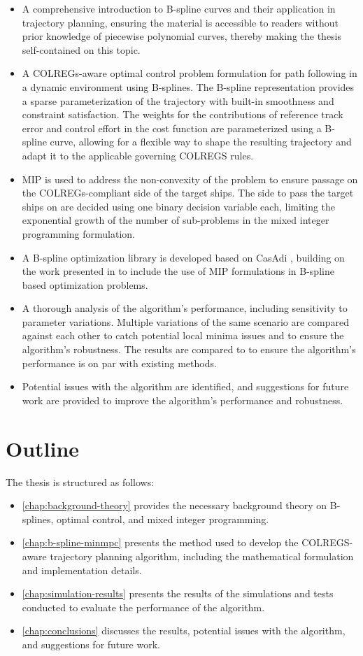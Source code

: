 \begin{itemize}
    \item A comprehensive introduction to B-spline curves and their application in trajectory planning, ensuring the material is accessible to readers without prior knowledge of piecewise polynomial curves, thereby making the thesis self-contained on this topic.
    \item A COLREGs-aware optimal control problem formulation for path following in a dynamic environment using B-splines. The B-spline representation provides a sparse parameterization of the trajectory with built-in smoothness and constraint satisfaction.
    The weights for the contributions of reference track error and control effort in the cost function are parameterized using a B-spline curve, allowing for a flexible way to shape the resulting trajectory and adapt it to the applicable governing COLREGS rules.
    \item \acrfull{MIP} is used to address the non-convexity of the problem to ensure passage on the COLREGs-compliant side of the target ships.
    The side to pass the target ships on are decided using one binary decision variable each, limiting the exponential growth of the number of sub-problems in the mixed integer programming formulation.
    \item A B-spline optimization library is developed based on CasAdi \citep{casadi}, building on the work presented in \citet{mercy2016spline} to include the use of \gls{MIP} formulations in B-spline based optimization problems.
    \item A thorough analysis of the algorithm's performance, including sensitivity to parameter variations. Multiple variations of the same scenario are compared against each other to catch potential local minima issues and to ensure the algorithm's robustness. The results are compared to \citet{Thyri2022-MPC} to ensure the algorithm's performance is on par with existing methods.
    \item Potential issues with the algorithm are identified, and suggestions for future work are provided to improve the algorithm's performance and robustness.
\end{itemize}


\section{Outline}
The thesis is structured as follows:
\begin{itemize}
    \item \cref{chap:background-theory} provides the necessary background theory on B-splines, optimal control, and mixed integer programming.
    \item \cref{chap:b-spline-minmpc} presents the method used to develop the COLREGS-aware trajectory planning algorithm, including the mathematical formulation and implementation details.
    \item \cref{chap:simulation-results} presents the results of the simulations and tests conducted to evaluate the performance of the algorithm.
    \item \cref{chap:conclusions} discusses the results, potential issues with the algorithm, and suggestions for future work.
\end{itemize}
